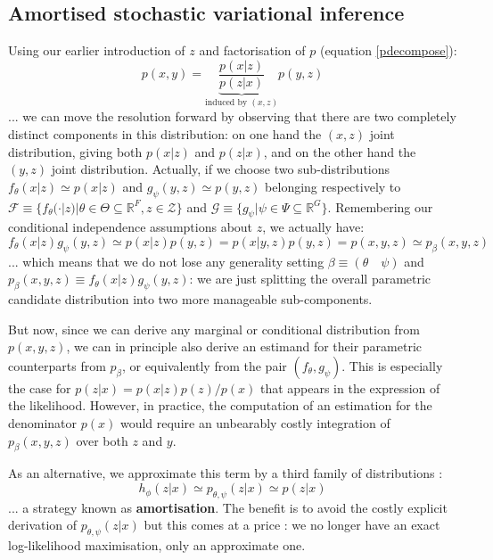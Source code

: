 \documentclass{article}
\begin{document}
\begin{appendix}
\subsection{Amortised stochastic variational inference}

Using our earlier introduction of $z$ and factorisation of $p$ (equation \ref{pdecompose}): 
\begin{equation*}
p(x,y)=\underbrace{\frac{p(x|z)}{p(z|x)}}_{\text{induced by  }(x,z)}p(y,z)
\end{equation*}
... we can move the resolution forward by observing that there are two completely distinct components in this distribution: on one hand the $(x,z)$ joint distribution, giving both $p(x|z)$ and $p(z|x)$, and on the other hand the $(y,z)$ joint distribution. Actually, if we choose two sub-distributions $f_{\theta}(x|z)\simeq p(x|z)$ and $g_{\psi}(y,z)\simeq p(y,z)$ belonging respectively to $\mathcal{F}\equiv\{f_{\theta}(\cdot|z)|\theta\in\Theta\subseteq\mathbb{R}^{F}, z\in\mathcal{Z}\}$ and $\mathcal{G}\equiv\{g_{\psi}|\psi\in\Psi\subseteq\mathbb{R}^{G}\}$. Remembering our conditional independence assumptions about $z$, we actually have:
$$f_{\theta}(x|z)g_{\psi}(y,z)\simeq p(x|z)p(y,z)=p(x|y,z)p(y,z)=p(x,y,z)\simeq p_\beta(x,y,z)$$
... which means that we do not lose any generality setting $\beta\equiv (\theta \quad \psi)$ and $p_\beta(x,y,z)\equiv f_{\theta}(x|z)g_{\psi}(y,z)$: we are just splitting the overall parametric candidate distribution into two more manageable sub-components.

But now, since we can derive any marginal or conditional distribution from $p(x,y,z)$, we can in principle also derive an estimand for their parametric counterparts from $p_\beta$, or equivalently from the pair $(f_\theta, g_\psi)$. This is especially the case for $p(z|x)=p(x|z)p(z) / p(x)$ that appears in the expression of the likelihood. However, in practice, the computation of an estimation for the denominator $p(x)$ would require an unbearably costly integration of $p_\beta(x,y,z)$ over both $z$ and $y$.

As an alternative, we approximate this term by a third family of distributions : $$h_\phi(z|x) \simeq p_{\theta,\psi}(z|x) \simeq p(z|x)$$ ... a strategy known as \textbf{amortisation}. The benefit is to avoid the costly explicit derivation of $p_{\theta,\psi}(z|x)$ but this comes at a price : we no longer have an exact log-likelihood maximisation, only an approximate one.


\end{appendix}
\end{document}
